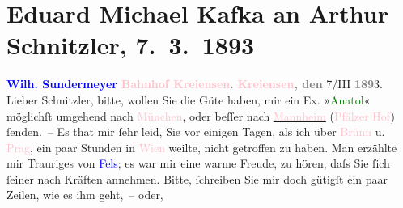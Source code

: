 

               \section[Eduard Michael Kafka an Arthur Schnitzler, 7. 3. 1893]{ Eduard Michael Kafka an Arthur Schnitzler, 7. 3. 1893}\nopagebreak{}\rehead{ }\normalsize\beginnumbering{} \toendnotes[C]{\smallbreak\pagebreak[2]} 
\pstart
           \noindent{}\centering{}{\pb}\textcolor{gray}{\textbf{\textcolor{blue}{Wilh. Sundermeyer}{}\ledrightnote{\textcolor{blue}{Wilhelm Sundermeyer}}}}\pend
           \pstart
           \noindent{}\centering{}\textcolor{gray}{\textbf{\textcolor{pink}{Bahnhof Kreiensen}{}\ledrightnote{\textcolor{pink}{Bahnhof}}.}}\pend
           \pstart
           \raggedleft{}\textcolor{gray}{\textbf{\textcolor{pink}{Kreiensen}{}\ledrightnote{\textcolor{pink}{Kreiensen}}, den }}7/III \textcolor{gray}{\textbf{189}}3.\pend
           \pstart{}Lieber Schnitzler,\pend\pstart
           bitte, wollen Sie die Güte haben, mir ein Ex. »\textcolor{green}{Anatol}{}\ledrightnote{\textcolor{green}{Anatol}}« möglichſt umgehend nach \textcolor{pink}{München}{}\ledrightnote{\textcolor{pink}{München}}, oder beſſer nach \uline{\textcolor{pink}{Mannheim}{}\ledrightnote{\textcolor{pink}{Mannheim}}} (\textcolor{pink}{Pfälzer Hof}{}\ledrightnote{\textcolor{pink}{Pfälzer Hof}}) ſenden. –\pend
           \pstart
           Es that mir ſehr leid, Sie vor einigen Tagen, als ich über \textcolor{pink}{Brünn}{}\ledrightnote{\textcolor{pink}{Brünn}} u. \textcolor{pink}{Prag}{}\ledrightnote{\textcolor{pink}{Prag}}, ein paar
                    Stunden in \textcolor{pink}{Wien}{}\ledrightnote{\textcolor{pink}{Wien}} weilte, nicht getroffen zu
                    haben.\pend
           \pstart
           Man erzählte mir Trauriges von \textcolor{blue}{Fels}{}\ledrightnote{\textcolor{blue}{Friedrich Michael Fels}}; es war
                    mir eine warme Freude, zu hören, daſs Sie ſich ſeiner nach Kräften annehmen.
                    Bitte, ſchreiben Sie mir doch gütigſt ein paar Zeilen, wie es ihm geht, – oder,
